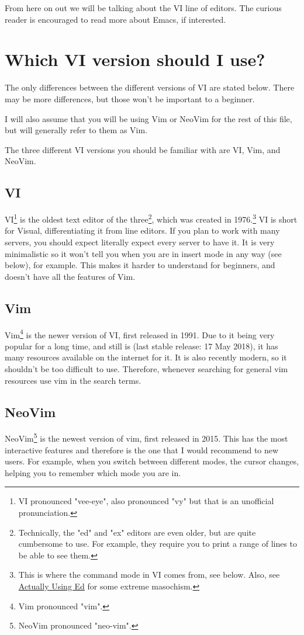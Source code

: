 \documentclass[11pt]{article}
\begin{document}
From here on out we will be talking about the VI line of editors. The curious
reader is encouraged to read more about Emacs, if interested.
\section{Which VI version should I use?}
\label{sec:orgb68054b}
The only differences between the different versions of VI are stated below.
There may be more differences, but those won't be important to a beginner.

I will also assume that you will be using Vim or NeoVim for the rest of this
file, but will generally refer to them as Vim.

The three different VI versions you should be familiar with are VI, Vim, 
and NeoVim.
\subsection{VI}
\label{sec:org985298e}
VI\footnote{VI pronounced "vee-eye", also pronounced "vy" but that is an
unofficial pronunciation.} is the oldest text editor of the three\footnote{Technically, the "ed" and "ex" editors are even older, but are 
quite cumbersome to use. For example, they require you to print a range
of lines to be able to see them.}, which was created in
1976.\footnote{This is where the command mode in VI comes from, see below. 
Also, see \href{https://sanctum.geek.nz/arabesque/actually-using-ed/}{Actually Using Ed} for some extreme masochism.} VI is short for Visual, differentiating it from line editors. If
you plan to work with many servers, you should expect literally expect every
server to have it. It is very minimalistic so it won't tell you when you are in
insert mode in any way (see below), for example. This makes it harder to
understand for beginners, and doesn't have all the features of Vim.
\subsection{Vim}
\label{sec:org30e7b7e}
Vim\footnote{Vim pronounced "vim".} is the newer version of VI, first released in 1991. Due to it being
very popular for a long time, and still is (last stable release: 17 May 2018),
it has many resources available on the internet for it. It is also recently
modern, so it shouldn't be too difficult to use. Therefore, whenever searching
for general vim resources use vim in the search terms.
\subsection{NeoVim}
\label{sec:org8bb2574}
NeoVim\footnote{NeoVim pronounced "neo-vim".} is the newest version of vim, first released in 2015. This has the
most interactive features and therefore is the one that I would recommend to new
users. For example, when you switch between different modes, the cursor changes,
helping you to remember which mode you are in.
\end{document}
